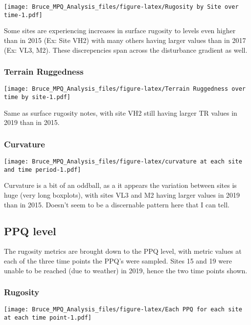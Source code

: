 \documentclass[]{article}
\begin{document}
\texttt{[image: Bruce\_MPQ\_Analysis\_files/figure-latex/Rugosity by Site over time-1.pdf]}

Some sites are experiencing increases in surface rugosity to levels even
higher than in 2015 (Ex: Site VH2) with many others having larger values
than in 2017 (Ex: VL3, M2). These discrepencies span across the
disturbance gradient as well.

\hypertarget{terrain-ruggedness-2}{%
\subsubsection{Terrain Ruggedness}\label{terrain-ruggedness-2}}

\texttt{[image: Bruce\_MPQ\_Analysis\_files/figure-latex/Terrain Ruggedness over time by site-1.pdf]}

Same as surface rugosity notes, with site VH2 still having larger TR
values in 2019 than in 2015.

\hypertarget{curvature-2}{%
\subsubsection{Curvature}\label{curvature-2}}

\texttt{[image: Bruce\_MPQ\_Analysis\_files/figure-latex/curvature at each site and time period-1.pdf]}

Curvature is a bit of an oddball, as a it appears the variation between
sites is huge (very long boxplots), with sites VL3 and M2 having larger
values in 2019 than in 2015. Doesn't seem to be a discernable pattern
here that I can tell.

\hypertarget{ppq-level}{%
\subsection{PPQ level}\label{ppq-level}}

The rugosity metrics are brought down to the PPQ level, with metric
values at each of the three time points the PPQ's were sampled. Sites 15
and 19 were unable to be reached (due to weather) in 2019, hence the two
time points shown.

\hypertarget{rugosity-3}{%
\subsubsection{Rugosity}\label{rugosity-3}}

\texttt{[image: Bruce\_MPQ\_Analysis\_files/figure-latex/Each PPQ for each site at each time point-1.pdf]}
\end{document}
